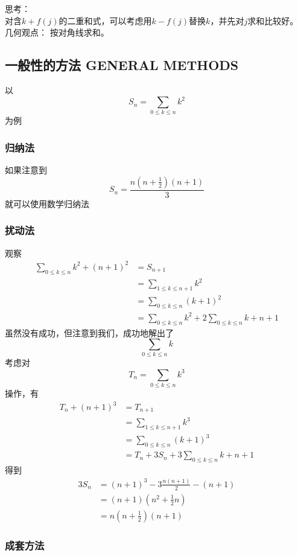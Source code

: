 \documentclass[12pt, a4paper, oneside]{ctexbook}
\newcommand{\newp}[1]{\vspace{#1\baselineskip}\noindent}
\begin{document}
\newp{2}
思考：\\

对含$k+f(j)$的二重和式，可以考虑用$k-f(j)$替换$k$，并先对$j$求和比较好。\\

几何观点： 按对角线求和。

\subsection{一般性的方法 GENERAL METHODS }

以
$$
S_n=\sum_{0\le k \le n} k^2
$$
为例

\subsubsection{归纳法}
如果注意到
$$
S_n=\frac{n(n+\frac{1}{2})(n+1)}{3}
$$
就可以使用数学归纳法

\subsubsection{扰动法}

观察
$$
\begin{aligned}
\sum_{0\le k \le n} k^2+(n+1)^2&=S_{n+1}\\
&=\sum_{1 \le  k\le n+1} k^2\\
&=\sum_{0 \le k \le n}(k+1)^2\\
&=\sum_{0\le k \le n} k^2+2\sum_{0\le k \le n} k+n+1
\end{aligned}
$$
虽然没有成功，但注意到我们，成功地解出了
$$
\sum_{0 \le k \le n} k
$$
考虑对
$$
T_n=\sum_{0 \le k \le n} k^3
$$
操作，有
$$
\begin{aligned}
T_n+(n+1)^3&=T_{n+1}\\
&=\sum_{1 \le k \le n+1} k^3\\
&=\sum_{0 \le k \le n} (k+1)^3\\
&=T_n+3S_n+3\sum_{0 \le k \le n}k+n+1
\end{aligned}
$$
得到
$$
\begin{aligned}
3S_n&=(n+1)^3-3\frac{n(n+1)}{2}-(n+1)\\
&=(n+1)\left(n^2+\frac{1}{2}n\right)\\
&=n(n+\frac{1}{2})(n+1)
\end{aligned}
$$

\subsubsection{成套方法}
\end{document}
